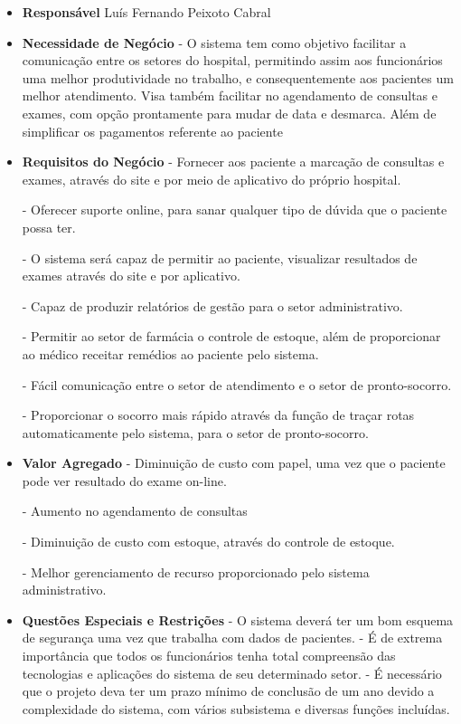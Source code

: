 \begin{itemize}
\item \textbf{Responsável}
\subitem Luís Fernando Peixoto Cabral
	
\item \textbf{Necessidade de Negócio}
\subitem - O sistema tem como objetivo facilitar a comunicação entre os setores do hospital, permitindo assim aos funcionários uma melhor produtividade no trabalho, e consequentemente aos   pacientes um melhor atendimento.
Visa também facilitar no agendamento de consultas e exames, com opção prontamente para mudar de data e desmarca. Além de simplificar os pagamentos referente ao paciente 
\item \textbf{Requisitos do Negócio}
\subitem - Fornecer aos paciente a marcação de consultas e exames, através do site e por meio de aplicativo do próprio hospital.

\subitem - Oferecer suporte online, para sanar qualquer tipo de dúvida que o paciente possa ter.

\subitem - O sistema será capaz de permitir ao paciente, visualizar resultados de exames através do site e por aplicativo.

\subitem - Capaz de produzir relatórios de gestão para o setor administrativo.

\subitem - Permitir ao setor de farmácia o controle de estoque, além de proporcionar ao médico receitar remédios ao paciente pelo sistema.

\subitem - Fácil comunicação entre o setor de atendimento e o setor de pronto-socorro.

 \subitem - Proporcionar o socorro mais rápido  através da função de traçar rotas automaticamente pelo sistema, para o setor de pronto-socorro.

       
\item \textbf{Valor Agregado	}
\subitem - Diminuição de custo com papel, uma vez que o paciente pode ver resultado do exame on-line.

\subitem - Aumento no agendamento de consultas
       
\subitem - Diminuição de custo com estoque, através do controle de estoque.
       
 \subitem - Melhor gerenciamento de recurso proporcionado pelo sistema administrativo.

              
\item \textbf{Questões Especiais e Restrições}
\subitem - O sistema deverá ter um bom esquema de segurança uma vez que trabalha com dados de pacientes. 
\subitem - É de extrema importância que todos os funcionários tenha total compreensão das tecnologias e aplicações do sistema de seu determinado setor.
\subitem - É necessário que o  projeto deva ter um prazo mínimo de conclusão de um ano devido a complexidade do sistema, com vários subsistema e diversas funções incluídas.

\end{itemize}

